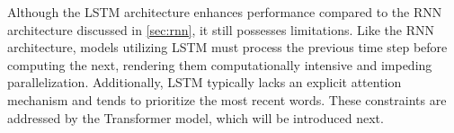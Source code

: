 Although the LSTM architecture enhances performance compared to the RNN architecture discussed in \autoref{sec:rnn}, it still possesses limitations. Like the RNN architecture, models utilizing LSTM must process the previous time step before computing the next, rendering them computationally intensive and impeding parallelization. Additionally, LSTM typically lacks an explicit attention mechanism and tends to prioritize the most recent words. These constraints are addressed by the Transformer model, which will be introduced next.